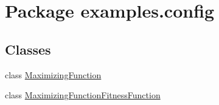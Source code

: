 \hypertarget{namespaceexamples_1_1config}{\section{Package examples.\-config}
\label{namespaceexamples_1_1config}
}
\subsection*{Classes}
\begin{DoxyCompactItemize}
\item 
class \hyperlink{classexamples_1_1config_1_1_maximizing_function}{Maximizing\-Function}
\item 
class \hyperlink{classexamples_1_1config_1_1_maximizing_function_fitness_function}{Maximizing\-Function\-Fitness\-Function}
\end{DoxyCompactItemize}
